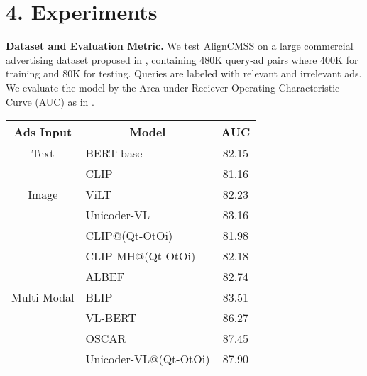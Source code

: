 \documentclass[letterpaper]{article} \usepackage{aaai24}  \usepackage{times}  \usepackage{helvet}  \usepackage{courier}  \usepackage[hyphens]{url}  \usepackage{graphicx} \urlstyle{rm} \def\UrlFont{\rm}  \usepackage{natbib}  \usepackage{caption} \frenchspacing  \setlength{\pdfpagewidth}{8.5in}  \setlength{\pdfpageheight}{11in}
\begin{document}
\section{4. Experiments}
\noindent\textbf{Dataset and Evaluation Metric.} We test AlignCMSS on a large commercial advertising dataset proposed in \cite{10.1145/3503161.3548226}, containing 480K query-ad pairs where 400K for training and 80K for testing. Queries are labeled with relevant and irrelevant ads. We evaluate the model by the Area under Reciever Operating Characteristic Curve (AUC) as in \cite{cortes2003auc}.

 \begin{table}[t]
\centering
\scalebox{1.1}
{\scriptsize
\renewcommand\arraystretch{1.1}
\setlength{\tabcolsep}{1.4mm}
\begin{tabular}{l|l|c}
\toprule
\multicolumn{1}{c|}{\textbf{Ads Input}}              & \multicolumn{1}{c|}{\textbf{Model}} & \textbf{AUC}   \\ \hline
\multicolumn{1}{c|}{Text}                   & BERT-base \cite{devlin2019bert}                & 82.15 \\ \hline
\multicolumn{1}{c|}{\multirow{3}{*}{Image}} & CLIP \cite{radford2021learning}                     & 81.16 \\
\multicolumn{1}{c|}{}                       & ViLT \cite{pmlr-v139-kim21k}                      & 82.23 \\
\multicolumn{1}{c|}{}                       & Unicoder-VL \cite{Li_Duan_Fang_Gong_Jiang_2020}              & 83.16 \\ \hline
\multirow{14}{*}{Multi-Modal}                & CLIP@(Qt-OtOi) \cite{10.1145/3503161.3548226}           & 81.98 \\
                                            & CLIP-MH@(Qt-OtOi) \cite{10.1145/3503161.3548226}        & 82.18 \\
                                            & ALBEF \cite{NEURIPS2021_50525975}       & 82.74 \\
                                            & BLIP \cite{pmlr-v162-li22n}       & 83.51 \\
& VL-BERT \cite{su2020vl-bert}    & 86.27 \\  
                                            & OSCAR \cite{li2020oscar}                    & 87.45 \\
                                            & Unicoder-VL@(Qt-OtOi) \cite{10.1145/3503161.3548226}    & 87.90 \\                            

\end{tabular}}
\end{table}
\end{document}
